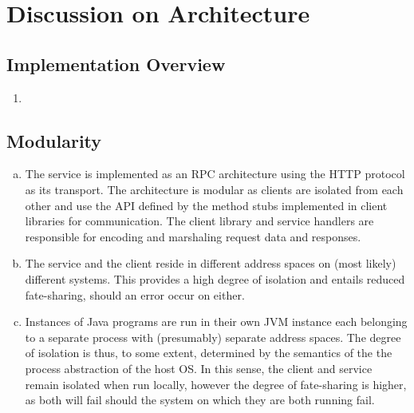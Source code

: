 \documentclass[11pt,a4paper,english]{article}
\begin{document}
\section{Discussion on Architecture}
\subsection{Implementation Overview}
\begin{enumerate}
\item{}
\end{enumerate}

\subsection{Modularity}
\begin{enumerate}[(a)]
\item{The service is implemented as an RPC architecture using the HTTP protocol
    as its transport. The architecture is modular as clients are isolated from
    each other and use the API defined by the method stubs implemented in client
    libraries for communication. The client library and service handlers are
    responsible for encoding and marshaling request data and responses.}

\item{The service and the client reside in different address spaces on (most
    likely) different systems. This provides a high degree of isolation and
    entails reduced fate-sharing, should an error occur on either.}

\item{Instances of Java programs are run in their own JVM instance each
    belonging to a separate process with (presumably) separate address
    spaces. The degree of isolation is thus, to some extent, determined by the
    semantics of the the process abstraction of the host OS. In this sense, the
    client and service remain isolated when run locally, however the degree of
    fate-sharing is higher, as both will fail should the system on which they
    are both running fail.}
\end{enumerate}
\end{document}
